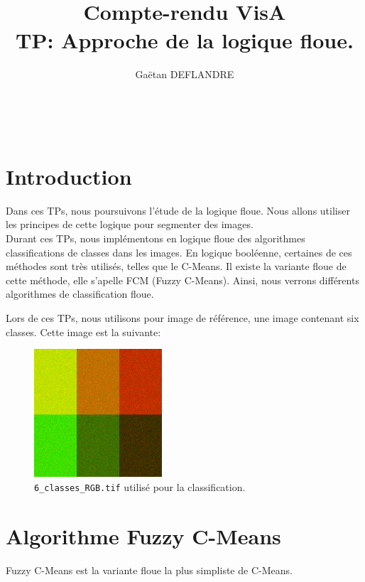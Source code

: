 \documentclass[a4paper,11pt]{article}
\title{
  \noindent\hrulefill \\
  \vspace{10mm}
  \textbf{Compte-rendu VisA} \\
  \vspace{5mm}
  TP: Approche de la logique floue.
}
\author{Gaëtan DEFLANDRE}
\begin{document}
\maketitle
\noindent\hrulefill \\


\section*{Introduction}

Dans ces TPs, nous poursuivons l'étude de la logique floue. Nous allons 
utiliser les principes de cette logique pour segmenter des images. \\

Durant ces TPs, nous implémentons en logique floue des algorithmes 
classifications de classes dans les images. En logique booléenne, 
certaines de ces méthodes sont très utilisés, telles que le C-Means. Il 
existe la variante floue de cette méthode, elle s'apelle FCM (Fuzzy 
C-Means). Ainsi, nous verrons différents algorithmes de classification 
floue.\\


\newpage



Lors de ces TPs, nous utilisons pour image de référence, une image 
contenant six classes. Cette image est la suivante:

\begin{figure}[H]
  \begin{center} 
    \includegraphics[width=180px]{../img/6_classes_RGB.png}
    \caption{\texttt{6\_classes\_RGB.tif} utilisé pour la classification.}
  \end{center}
\end{figure}

\section{Algorithme Fuzzy C-Means}

Fuzzy C-Means est la variante floue la plus simpliste de C-Means.	
\end{document}
